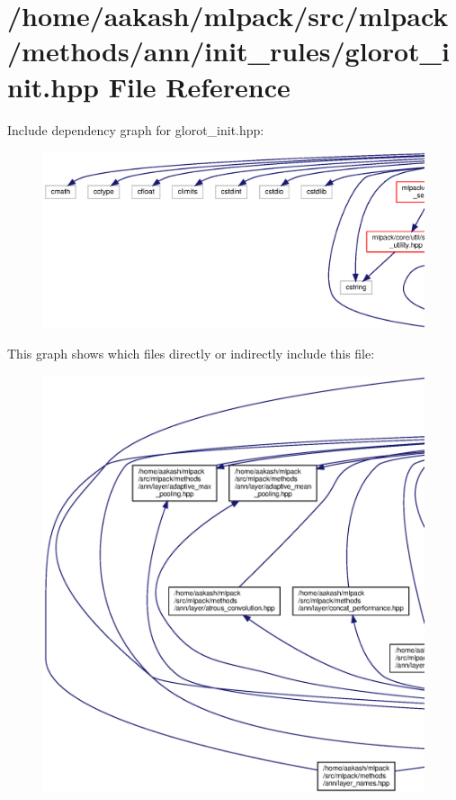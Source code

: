 \section{/home/aakash/mlpack/src/mlpack/methods/ann/init\+\_\+rules/glorot\+\_\+init.hpp File Reference}
\label{glorot__init_8hpp}
Include dependency graph for glorot\+\_\+init.\+hpp\+:
\nopagebreak
\begin{figure}[H]
\begin{center}
\leavevmode
\includegraphics[width=350pt]{glorot__init_8hpp__incl}
\end{center}
\end{figure}
This graph shows which files directly or indirectly include this file\+:
\nopagebreak
\begin{figure}[H]
\begin{center}
\leavevmode
\includegraphics[width=350pt]{glorot__init_8hpp__dep__incl}
\end{center}
\end{figure}
